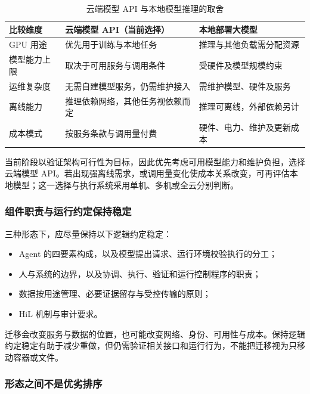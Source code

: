 \documentclass[11pt,a4paper]{article}
\begin{document}
\begin{table}[H]
\centering
\renewcommand{\arraystretch}{1.35}
\begin{tabularx}{\textwidth}{P{2.4cm} P{3.8cm} L}
\toprule
\textbf{比较维度} & \textbf{云端模型 API（当前选择）} & \textbf{本地部署大模型} \\
\midrule
GPU 用途 & 优先用于训练与本地任务 & 推理与其他负载需分配资源 \\
模型能力上限 & 取决于可用服务与调用条件 & 受硬件及模型规模约束 \\
运维复杂度 & 无需自建模型服务，仍需维护接入 & 需维护模型、硬件及服务 \\
离线能力 & 推理依赖网络，其他任务视依赖而定 & 推理可离线，外部依赖另计 \\
成本模式 & 按服务条款与调用量付费 & 硬件、电力、维护及更新成本 \\
\bottomrule
\end{tabularx}
\caption{云端模型 API 与本地模型推理的取舍}
\end{table}

当前阶段以验证架构可行性为目标，因此优先考虑可用模型能力和维护负担，选择云端模型 API。若出现强离线需求，或调用量变化使成本关系改变，可再评估本地模型；这一选择与执行系统采用单机、多机或全云分别判断。

\subsubsection{组件职责与运行约定保持稳定}

三种形态下，应尽量保持以下逻辑约定稳定：

\begin{itemize}[leftmargin=2em,itemsep=2pt]
  \item Agent 的四要素构成，以及模型提出请求、运行环境校验执行的分工；
  \item 人与系统的边界，以及协调、执行、验证和运行控制程序的职责；
  \item 数据按用途管理、必要证据留存与受控传输的原则；
  \item HiL 机制与审计要求。
\end{itemize}

迁移会改变服务与数据的位置，也可能改变网络、身份、可用性与成本。保持逻辑约定稳定有助于减少重做，但仍需验证相关接口和运行行为，不能把迁移视为只移动容器或文件。

\subsubsection{形态之间不是优劣排序}
\end{document}
